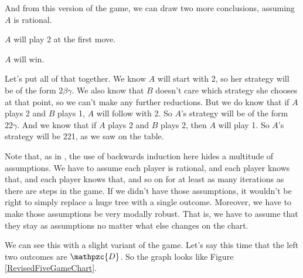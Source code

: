\pagebreak[1]
And from this version of the game, we can draw two more conclusions, assuming $A$ is rational.

\begin{itemize*}
\item $A$ will play 2 at the first move.
\item $A$ will win.
\end{itemize*}

\noindent Let's put all of that together. We know $A$ will start with 2, so her strategy will be of the form $2 \beta \gamma$. We also know that $B$ doesn't care which strategy she chooses at that point, so we can't make any further reductions. But we do know that if $A$ plays 2 and $B$ plays 1, $A$ will follow with 2. So $A$'s strategy will be of the form $2 2 \gamma$. And we know that if $A$ plays 2 and $B$ plays 2, then $A$ will play 1. So $A$'s strategy will be 221, as we saw on the table.

Note that, as in , the use of backwards induction here hides a multitude of assumptions. We have to assume each player is rational, and each player knows that, and each player knows that, and so on for at least as many iterations as there are steps in the game. If we didn't have those assumptions, it wouldn't be right to simply replace a huge tree with a single outcome. Moreover, we have to make those assumptions be very modally robust. That is, we have to assume that they stay as assumptions no matter what else changes on the chart.

We can see this with a slight variant of the game. Let's say this time that the left two outcomes are $\mathpzc{D}$. So the graph looks like Figure \ref{RevisedFiveGameChart}.

